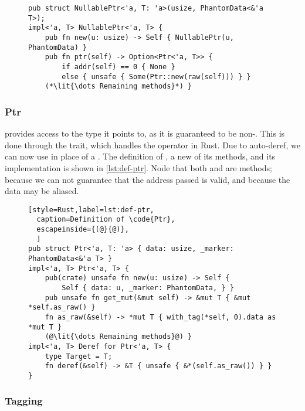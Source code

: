 \begin{figure}[ht]
  \begin{lstlisting}[style=Rust,label=lst:def-nullableptr,
  caption=Definition of \code{NullablePtr}]
pub struct NullablePtr<'a, T: 'a>(usize, PhantomData<&'a T>);
impl<'a, T> NullablePtr<'a, T> {
    pub fn new(u: usize) -> Self { NullablePtr(u, PhantomData) }
    pub fn ptr(self) -> Option<Ptr<'a, T>> {
        if addr(self) == 0 { None }
        else { unsafe { Some(Ptr::new(raw(self))) } }
    (*\lit{\dots Remaining methods}*) }
\end{lstlisting}
\end{figure}


\subsubsection{Ptr}

 provides access to the type it points to, as it is guaranteed to be non-.
This is done through the  trait, which handles the \code{*} operator in Rust. Due to
auto-deref, we can now use  in place of a . The definition of ,
a new of its methods, and its  implementation is shown in \cref{lst:def-ptr}. Node that
both  and  are  methods;  because we can not
guarantee that the address passed is valid, and  because the data may be aliased.

\begin{figure}[ht]
  \begin{lstlisting}[style=Rust,label=lst:def-ptr,
  caption=Definition of \code{Ptr},
  escapeinside={(@}{@)},
  ]
pub struct Ptr<'a, T: 'a> { data: usize, _marker: PhantomData<&'a T> }
impl<'a, T> Ptr<'a, T> {
    pub(crate) unsafe fn new(u: usize) -> Self {
        Self { data: u, _marker: PhantomData, } }
    pub unsafe fn get_mut(&mut self) -> &mut T { &mut *self.as_raw() }
    fn as_raw(&self) -> *mut T { with_tag(*self, 0).data as *mut T }
    (@\lit{\dots Remaining methods}@) }
impl<'a, T> Deref for Ptr<'a, T> {
    type Target = T;
    fn deref(&self) -> &T { unsafe { &*(self.as_raw()) } } }
\end{lstlisting}
\end{figure}


\subsubsection{Tagging}

